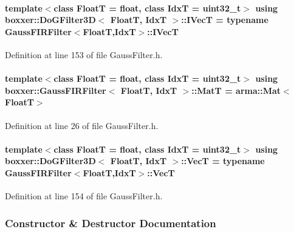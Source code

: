 \paragraph[{\texorpdfstring{I\+VecT}{IVecT}}]{\setlength{\rightskip}{0pt plus 5cm}template$<$class FloatT  = float, class IdxT  = uint32\+\_\+t$>$ using {\bf boxxer\+::\+Do\+G\+Filter3D}$<$ FloatT, IdxT $>$\+::{\bf I\+VecT} =  typename {\bf Gauss\+F\+I\+R\+Filter}$<$FloatT,IdxT$>$\+::{\bf I\+VecT}}\hypertarget{classboxxer_1_1DoGFilter3D_a64697cd44dcac80b42e843c05358dd26}{}\label{classboxxer_1_1DoGFilter3D_a64697cd44dcac80b42e843c05358dd26}


Definition at line 153 of file Gauss\+Filter.\+h.

\paragraph[{\texorpdfstring{MatT}{MatT}}]{\setlength{\rightskip}{0pt plus 5cm}template$<$class FloatT = float, class IdxT = uint32\+\_\+t$>$ using {\bf boxxer\+::\+Gauss\+F\+I\+R\+Filter}$<$ FloatT, IdxT $>$\+::{\bf MatT} =  arma\+::\+Mat$<$FloatT$>$\hspace{0.3cm}{\ttfamily [inherited]}}\hypertarget{classboxxer_1_1GaussFIRFilter_a83cf4c7f4782f69918c0e0883fff5412}{}\label{classboxxer_1_1GaussFIRFilter_a83cf4c7f4782f69918c0e0883fff5412}


Definition at line 26 of file Gauss\+Filter.\+h.

\paragraph[{\texorpdfstring{VecT}{VecT}}]{\setlength{\rightskip}{0pt plus 5cm}template$<$class FloatT  = float, class IdxT  = uint32\+\_\+t$>$ using {\bf boxxer\+::\+Do\+G\+Filter3D}$<$ FloatT, IdxT $>$\+::{\bf VecT} =  typename {\bf Gauss\+F\+I\+R\+Filter}$<$FloatT,IdxT$>$\+::{\bf VecT}}\hypertarget{classboxxer_1_1DoGFilter3D_aea578fd16f3044b93be02a0a634c013d}{}\label{classboxxer_1_1DoGFilter3D_aea578fd16f3044b93be02a0a634c013d}


Definition at line 154 of file Gauss\+Filter.\+h.



\subsubsection{Constructor \& Destructor Documentation}

